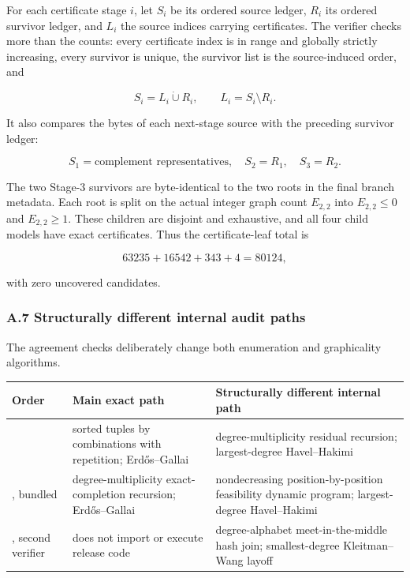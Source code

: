 \documentclass[
  english,
  11pt,
  a4paper,
]{article}
\newcounter{none} %
\begin{document}
For each certificate stage \(i\), let \(S_i\) be its ordered source
ledger, \(R_i\) its ordered survivor ledger, and \(L_i\) the source
indices carrying certificates. The verifier checks more than the counts:
every certificate index is in range and globally strictly increasing,
every survivor is unique, the survivor list is the source-induced order,
and

\[
S_i=L_i\mathbin{\dot\cup}R_i,
\qquad
L_i=S_i\setminus R_i.
\tag{A.9}
\]

It also compares the bytes of each next-stage source with the preceding
survivor ledger:

\[
S_1=\text{complement representatives},
\quad S_2=R_1,
\quad S_3=R_2.
\tag{A.10}
\]

The two Stage-3 survivors are byte-identical to the two roots in the
final branch metadata. Each root is split on the actual integer graph
count \(E_{2,2}\) into \(E_{2,2}\le0\) and \(E_{2,2}\ge1\). These
children are disjoint and exhaustive, and all four child models have
exact certificates. Thus the certificate-leaf total is

\[
63235+16542+343+4=80124,
\]

with zero uncovered candidates.

\subsubsection{A.7 Structurally different internal audit
paths}\label{a.7-structurally-different-internal-audit-paths}

The agreement checks deliberately change both enumeration and
graphicality algorithms.

{\def\LTcaptype{none} %
\begin{longtable}[]{@{}
  >{\raggedright\arraybackslash}p{}
  >{\raggedright\arraybackslash}p{}
  >{\raggedright\arraybackslash}p{}@{}}
\toprule\noalign{}
\begin{minipage}[b]{\linewidth}\raggedright
Order
\end{minipage} & \begin{minipage}[b]{\linewidth}\raggedright
Main exact path
\end{minipage} & \begin{minipage}[b]{\linewidth}\raggedright
Structurally different internal path
\end{minipage} \\
\midrule\noalign{}
\endhead
\bottomrule\noalign{}
\endlastfoot
16 & sorted tuples by combinations with repetition; Erdős--Gallai &
degree-multiplicity residual recursion; largest-degree Havel--Hakimi \\
20, bundled & degree-multiplicity exact-completion recursion;
Erdős--Gallai & nondecreasing position-by-position feasibility dynamic
program; largest-degree Havel--Hakimi \\
20, second verifier & does not import or execute release code &
degree-alphabet meet-in-the-middle hash join; smallest-degree
Kleitman--Wang layoff \\
\end{longtable}
}
\end{document}
